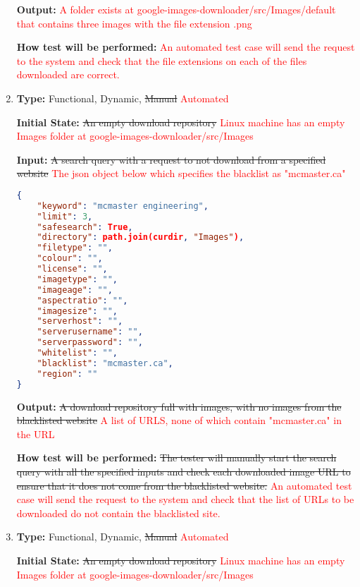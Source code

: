 \documentclass[12pt, titlepage]{article}
\begin{document}
\begin{enumerate}[label=FR-SQ\arabic*:, wide=0pt, leftmargin=*]
\textbf{Output:} \textcolor{red}{A folder exists at google-images-downloader/src/Images/default that contains
three images with the file extension .png}
					
\textbf{How test will be performed:} \textcolor{red}{An automated test case will send the request 
to the system and check that the file extensions on each of the files downloaded are correct.}

\item \phantom{empty}

\textbf{Type:} Functional, Dynamic, \sout{Manual} \textcolor{red}{Automated}
					
\textbf{Initial State:} \sout{An empty download repository}
\textcolor{red}{Linux machine has an empty Images folder at google-images-downloader/src/Images}
					
\textbf{Input:} \sout{A search query with a request to not download from a specified website}
\textcolor{red}{The json object below which specifies the blacklist as "mcmaster.ca"}
\begin{lstlisting}[language=json,firstnumber=1]
{
	"keyword": "mcmaster engineering",
	"limit": 3,
	"safesearch": True,
	"directory": path.join(curdir, "Images"),
	"filetype": "",
	"colour": "",
	"license": "",
	"imagetype": "",
	"imageage": "",
	"aspectratio": "",
	"imagesize": "",
	"serverhost": "",
	"serverusername": "",
	"serverpassword": "",
	"whitelist": "",
	"blacklist": "mcmaster.ca",
	"region": ""
}
\end{lstlisting}
					
\textbf{Output:} \sout{A download repository full with images, with no images from the blacklisted website}
\textcolor{red}{A list of URLS, none of which contain "mcmaster.ca" in the URL}
					
\textbf{How test will be performed:} \sout{The tester will manually start the search query with all 
the specified inputs and check each downloaded image URL to ensure that it does not come from 
the blacklisted website.}
\textcolor{red}{An automated test case will send the request to the system and check that the list 
of URLs to be downloaded do not contain the blacklisted site.}

\item \phantom{empty}

\textbf{Type:} Functional, Dynamic, \sout{Manual} \textcolor{red}{Automated}
					
\textbf{Initial State:} \sout{An empty download repository}
\textcolor{red}{Linux machine has an empty Images folder at google-images-downloader/src/Images}
					

\end{enumerate}
\end{document}
